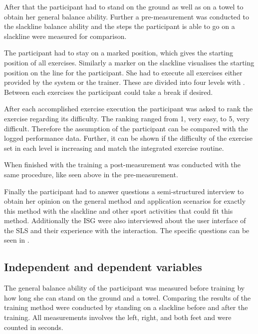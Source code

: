 
After that the participant had to stand on the ground as well as on a towel to obtain her general balance ability.
Further a pre-measurement was conducted to the slackline balance ability and the steps the participant is able to go on a slackline were measured for comparison.

The participant had to stay on a marked position, which gives the starting position of all exercises. Similarly a marker on the slackline visualises the starting position on the line for the participant. She had to execute all exercises either provided by the system or the trainer. These are divided into four levels with . Between each exercises the participant could take a break if desired.

After each accomplished exercise execution the participant was asked to rank the exercise regarding its difficulty. The ranking ranged from 1, very easy, to 5, very difficult. Therefore the assumption of the participant can be compared with the logged performance data. Further, it can be shown if the difficulty of the exercise set in each level is increasing and match the integrated exercise routine.



When finished with the training a post-measurement was conducted with the same procedure, like seen above in the pre-measurement.

Finally the participant had to answer questions a semi-structured interview to obtain her opinion on the general method and application scenarios for exactly this method with the slackline and other sport activities that could fit this method. Additionally the ISG were also interviewed about the user interface of the SLS and their experience with the interaction. The specific questions can be seen in .

\subsection{Independent and dependent variables}\label{6_variables}
The general balance ability of the participant was measured before training by how long she can stand on the ground and a towel. Comparing the results of the training method were conducted by standing on a slackline before and after the training. All measurements involves the left, right, and both feet and were counted in seconds. 

